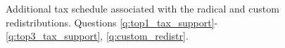 \begin{figure}[h!]
    \caption[Tax schedule of radical and custom redistributions]{Additional tax schedule associated with the radical and custom redistributions. Questions \ref{q:top1_tax_support}-\ref{q:top3_tax_support}, \ref{q:custom_redistr}.
    }\label{fig:tax_radical_redistr}
\end{figure}

\clearpage
